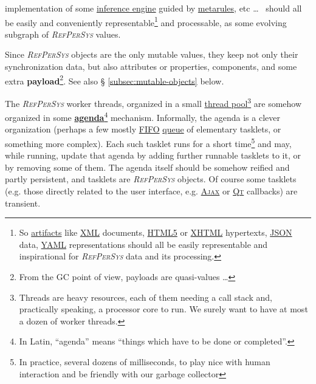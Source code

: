 \documentclass[11pt,a4paper,svgnames]{article}
\newcommand{\RefPerSys}{{\textit{\textsc{RefPerSys}}}}
\begin{document}
implementation of some
\href{https://en.wikipedia.org/wiki/Inference_engine}{inference
  engine} guided by
\href{https://en.wiktionary.org/wiki/metarule}{metarules}, etc \ldots~
should all be easily and conveniently representable\footnote{So
\href{https://en.wikipedia.org/wiki/Artifact_(software_development)}{artifacts}
like \href{https://en.wikipedia.org/wiki/XML}{\textsc{XML}} documents,
\href{https://en.wikipedia.org/wiki/HTML5}{\textsc{HTML5}} or
\href{https://en.wikipedia.org/wiki/XHTML}{\textsc{XHTML}} hypertexts,
\href{http://json.org/}{\textsc{JSON}} data,
\href{https://yaml.org/}{\textsc{YAML}} representations should all be
easily representable and inspirational for {\RefPerSys} data and its
processing.}  and processable, as some evolving subgraph of
{\RefPerSys} values.

Since {\RefPerSys} objects are the only mutable values, they keep not
only their synchronization data, but also attributes or properties,
components, and some extra 
\textbf{payload}\footnote{From the GC point of view, payloads are
quasi-values  \ldots}. See also \S
  \ref{subsec:mutable-objects} below.

The {\RefPerSys} worker threads, organized in a small
\href{https://en.wikipedia.org/wiki/Thread_pool}{thread
  pool}\footnote{Threads are heavy resources, each of them needing a
call stack and, practically speaking, a processor core to run. We
surely want to have at most a dozen of worker threads.} are somehow
organized in some
\href{https://en.wikipedia.org/wiki/Agenda}{\textbf{agenda}}\footnote{In
Latin, ``agenda'' means ``things which have to be done or
completed''.}  mechanism. Informally, the agenda is a clever
organization (perhaps a few mostly
\href{https://en.wikipedia.org/wiki/FIFO}{FIFO}
\href{https://en.wikipedia.org/wiki/Queue\_(abstract\_data\_type)}{queue}
of elementary tasklets, or something more complex). Each such tasklet
runs for a short time\footnote{In practice, several dozens of
milliseconds, to play nice with human interaction and be friendly with
our garbage collector} and may, while running, update that agenda by
adding further runnable tasklets to it, or by removing some of
them. The agenda itself should be somehow reified and partly
persistent, and tasklets are {\RefPerSys} objects. Of course some
tasklets (e.g. those directly related to the user interface,
e.g. \href{https://en.wikipedia.org/wiki/Ajax_(programming)}{\textsc{Ajax}}
or \href{http://qt.io/}{\textsc{Qt}} callbacks) are transient.

\label{subsec:datalowhigh}
\end{document}
